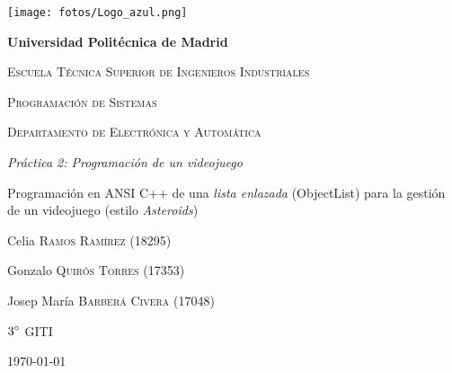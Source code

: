 


	\begin{titlepage}
	\centering
    {\texttt{[image: fotos/Logo\_azul.png]}\par}
	\vspace{1cm}
	{\bfseries\LARGE Universidad Politécnica de Madrid \par}
	\vspace{0.3cm}
	{\scshape\Large Escuela Técnica Superior de Ingenieros Industriales \par}
	\vspace{2.5cm}
	{\scshape\Huge Programación de Sistemas \par}
	\vspace{0.3cm}
	{\scshape\large Departamento de Electrónica y Automática \par}
	\vspace{2cm}
    {\itshape\LARGE Práctica 2: Programación de un videojuego \par}
    \vspace{0.5cm}
    {\upshape\large Programación en ANSI C++ de una \emph{lista enlazada} (ObjectList) para la gestión de un videojuego (estilo \textit{Asteroids})}
	\vfill
	{\large{Celia \textsc{Ramos Ramírez} (18295)\par}}
	\vspace{0.1cm}
    {\large{Gonzalo \textsc{Quirós Torres} (17353)\par}}
	\vspace{0.1cm}
	{\large{Josep María \textsc{Barberá Civera} (17048)\par}}
	\vfill
	{\Large{ $3^{\circ}$ \textsc{GITI}}\par}
	\vfill
	{\Large \today \par}
	\end{titlepage}
	


 


